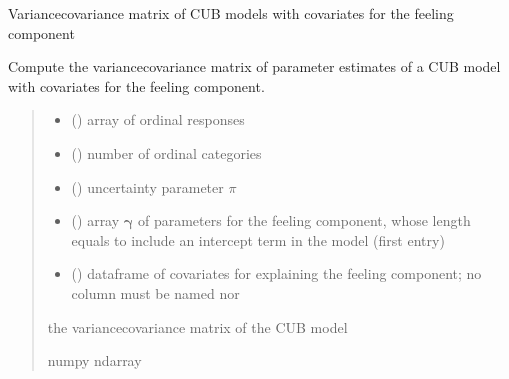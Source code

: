 \documentclass[letterpaper,10pt,english]{sphinxmanual}
\begin{document}

\begin{fulllineitems}
\label{\detokenize{cubmods:cubmods.cub_0w.varcov}}
\pysigstartsignatures
{}
\pysigstopsignatures
\sphinxAtStartPar
Variance\sphinxhyphen{}covariance matrix of CUB models with covariates for the feeling component

\sphinxAtStartPar
Compute the variance\sphinxhyphen{}covariance matrix of parameter estimates of a CUB model
with covariates for the feeling component.
\begin{quote}\begin{description}
\begin{itemize}
\item {} 
\sphinxAtStartPar
{} () \textendash{} array of ordinal responses

\item {} 
\sphinxAtStartPar
{} () \textendash{} number of ordinal categories

\item {} 
\sphinxAtStartPar
{} () \textendash{} uncertainty parameter \(\pi\)

\item {} 
\sphinxAtStartPar
{} () \textendash{} array \(\pmb \gamma\) of parameters for the feeling component, whose length equals 
 to include an intercept term in the model (first entry)

\item {} 
\sphinxAtStartPar
{} () \textendash{} dataframe of covariates for explaining the feeling component;
no column must be named  nor 

\end{itemize}

\sphinxAtStartPar
the variance\sphinxhyphen{}covariance matrix of the CUB model

\sphinxAtStartPar
numpy ndarray

\end{description}\end{quote}

\end{fulllineitems}
\end{document}
